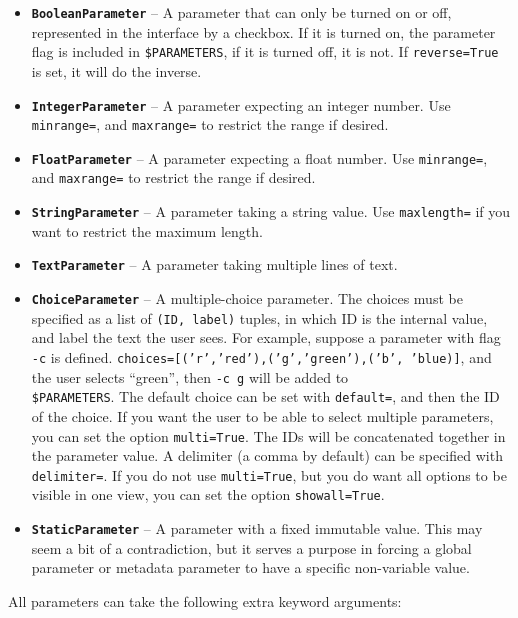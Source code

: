 \documentclass[a4paper,12pt,twoside,openright]{report}
\begin{document}
\begin{itemize}
\item \textbf{\texttt{BooleanParameter}} -- A parameter that can only be turned on or off, represented in the interface by a checkbox. If it is turned on, the parameter flag is included in \texttt{\$PARAMETERS}, if it is turned off, it is not. If \texttt{reverse=True} is set, it will do the inverse.
\item \textbf{\texttt{IntegerParameter}} -- A parameter expecting an integer number. Use \texttt{minrange=}, and \texttt{maxrange=} to restrict the range if desired.
\item \textbf{\texttt{FloatParameter}} -- A parameter expecting a float number. Use \texttt{minrange=}, and \texttt{maxrange=} to restrict the range if desired.
\item \textbf{\texttt{StringParameter}} -- A parameter taking a string value. Use \texttt{maxlength=} if you want to restrict the maximum length.
\item \textbf{\texttt{TextParameter}} -- A parameter taking multiple lines of text. 
\item \textbf{\texttt{ChoiceParameter}} -- A multiple-choice parameter. The
  choices must be specified as a list of \texttt{(ID, label)} tuples, in which
  ID is the internal value, and label the text the user sees. For example,
  suppose a parameter with flag \texttt{-c} is defined.
  \texttt{choices=[('r','red'),('g','green'),('b', 'blue)]}, and the user
  selects ``green'', then  \texttt{-c g} will be added to \\
  \texttt{\$PARAMETERS}. The default choice can be set with \texttt{default=},
  and then the ID of the choice. If you want the user to be able to select
  multiple parameters, you can set the option \texttt{multi=True}. The IDs
  will be concatenated together in the parameter value. A delimiter (a comma by
  default) can be specified with \texttt{delimiter=}. If you do not use
  \texttt{multi=True}, but you do want all options to be visible in one view,
  you can set the option \texttt{showall=True}.
\item \textbf{\texttt{StaticParameter}} -- A parameter with a fixed immutable
  value. This may seem a bit of a contradiction, but it serves a purpose in
  forcing a global parameter or metadata parameter to have a specific non-variable value.
\end{itemize}

All parameters can take the following extra keyword arguments:
\end{document}
